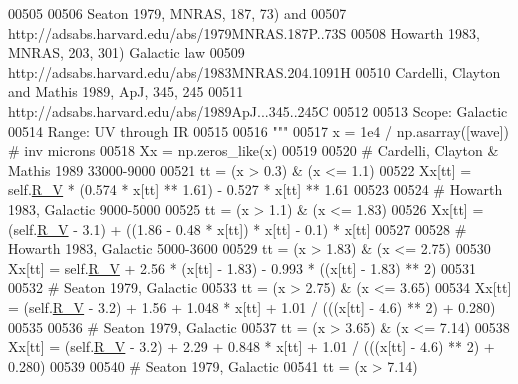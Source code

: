 \begin{DoxyCode}
00505 \textcolor{stringliteral}{        }
00506 \textcolor{stringliteral}{        Seaton 1979, MNRAS, 187, 73) and }
00507 \textcolor{stringliteral}{        http://adsabs.harvard.edu/abs/1979MNRAS.187P..73S}
00508 \textcolor{stringliteral}{        Howarth 1983, MNRAS, 203, 301) Galactic law}
00509 \textcolor{stringliteral}{        http://adsabs.harvard.edu/abs/1983MNRAS.204.1091H}
00510 \textcolor{stringliteral}{        Cardelli, Clayton and Mathis 1989, ApJ, 345, 245}
00511 \textcolor{stringliteral}{        http://adsabs.harvard.edu/abs/1989ApJ...345..245C}
00512 \textcolor{stringliteral}{        }
00513 \textcolor{stringliteral}{        Scope: Galactic}
00514 \textcolor{stringliteral}{        Range: UV through IR}
00515 \textcolor{stringliteral}{        }
00516 \textcolor{stringliteral}{        """}
00517         x = 1e4 / np.asarray([wave]) \textcolor{comment}{# inv microns}
00518         Xx = np.zeros\_like(x)
00519 
00520         \textcolor{comment}{# Cardelli, Clayton & Mathis 1989 33000-9000}
00521         tt = (x > 0.3) & (x <= 1.1)
00522         Xx[tt] = self.\hyperlink{classpyneb_1_1extinction_1_1red__corr_1_1_red_corr_a4696ecdd84c912c20e6aa19b1573e875}{R\_V} * (0.574 * x[tt] ** 1.61) - 0.527 * x[tt] ** 1.61
00523         
00524         \textcolor{comment}{# Howarth 1983, Galactic 9000-5000}
00525         tt = (x > 1.1) & (x <= 1.83)
00526         Xx[tt] = (self.\hyperlink{classpyneb_1_1extinction_1_1red__corr_1_1_red_corr_a4696ecdd84c912c20e6aa19b1573e875}{R\_V} - 3.1) + ((1.86 - 0.48 * x[tt]) * x[tt] - 0.1) * x[tt]
00527         
00528         \textcolor{comment}{# Howarth 1983, Galactic 5000-3600}
00529         tt = (x > 1.83) & (x <= 2.75)
00530         Xx[tt] = self.\hyperlink{classpyneb_1_1extinction_1_1red__corr_1_1_red_corr_a4696ecdd84c912c20e6aa19b1573e875}{R\_V} + 2.56 * (x[tt] - 1.83) - 0.993 * ((x[tt] - 1.83) ** 2)
00531 
00532         \textcolor{comment}{# Seaton 1979, Galactic}
00533         tt = (x > 2.75) & (x <= 3.65)
00534         Xx[tt] = (self.\hyperlink{classpyneb_1_1extinction_1_1red__corr_1_1_red_corr_a4696ecdd84c912c20e6aa19b1573e875}{R\_V} - 3.2) + 1.56 + 1.048 * x[tt] + 1.01 / (((x[tt] - 4.6) ** 2) + 0.280)
00535         
00536         \textcolor{comment}{# Seaton 1979, Galactic}
00537         tt = (x > 3.65) & (x <= 7.14)
00538         Xx[tt] = (self.\hyperlink{classpyneb_1_1extinction_1_1red__corr_1_1_red_corr_a4696ecdd84c912c20e6aa19b1573e875}{R\_V} - 3.2) + 2.29 + 0.848 * x[tt] + 1.01 / (((x[tt] - 4.6) ** 2) + 0.280)
00539         
00540         \textcolor{comment}{# Seaton 1979, Galactic}
00541         tt = (x > 7.14) 

\end{DoxyCode}
